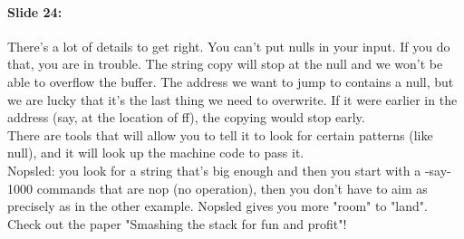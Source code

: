 \documentclass[10pt,a4paper]{report}
\begin{document}
\paragraph{Slide 24:} There's a lot of details to get right. You can't put nulls in your input. If you do that, you are in trouble. The string copy will stop at the null and we won't be able to overflow the buffer. The address we want to jump to contains a null, but we are lucky that it's the last thing we need to overwrite. If it were earlier in the address (say, at the location of ff), the copying would stop early.\\
There are tools that will allow you to tell it to look for certain patterns (like null), and it will look up the machine code to pass it.\\
Nopsled: you look for a string that's big enough and then you start with a -say- 1000 commands that are nop (no operation), then you don't have to aim as precisely as in the other example. Nopsled gives you more "room" to "land". \\
Check out the paper "Smashing the stack for fun and profit"!
\end{document}
